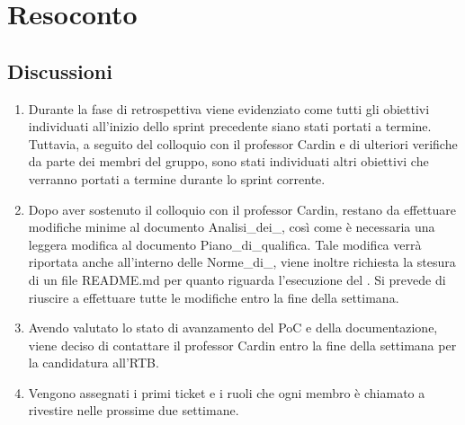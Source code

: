 \section{Resoconto} \label{sec:resoconto}
\subsection{Discussioni} \label{subsec:resdiscussione}
\begin{enumerate}
    \item Durante la fase di retrospettiva viene evidenziato come tutti gli obiettivi individuati all'inizio dello sprint precedente siano stati portati a termine. Tuttavia, a seguito del colloquio con il professor Cardin e di ulteriori verifiche da parte dei membri del gruppo, sono stati individuati altri obiettivi che verranno portati a termine durante lo sprint corrente.
    \item Dopo aver sostenuto il colloquio con il professor Cardin, restano da effettuare modifiche minime al documento Analisi\_dei\_, così come è necessaria una leggera modifica al documento Piano\_di\_qualifica. Tale modifica verrà riportata anche all'interno delle Norme\_di\_, viene inoltre richiesta la stesura di un file README.md per quanto riguarda l'esecuzione del . Si prevede di riuscire a effettuare tutte le modifiche entro la fine della settimana.
    \item Avendo valutato lo stato di avanzamento del PoC e della documentazione, viene deciso di contattare il professor Cardin entro la fine della settimana per la candidatura all'RTB.
    \item Vengono assegnati i primi ticket e i ruoli che ogni membro è chiamato a rivestire nelle prossime due settimane.
\end{enumerate}


